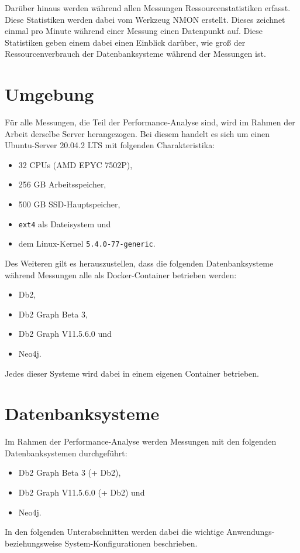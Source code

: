 Darüber hinaus werden während allen Messungen Ressourcenstatistiken erfasst. Diese Statistiken werden dabei vom Werkzeug NMON erstellt. Dieses zeichnet einmal pro Minute während einer Messung einen Datenpunkt auf. Diese Statistiken geben einem dabei einen Einblick darüber, wie groß der Ressourcenverbrauch der Datenbanksysteme während der Messungen ist.

\section{Umgebung}
\label{analyse:umgebung}
Für alle Messungen, die Teil der Performance-Analyse sind, wird im Rahmen der Arbeit derselbe Server herangezogen. Bei diesem handelt es sich um einen Ubuntu-Server 20.04.2 LTS mit folgenden Charakteristika:
\begin{itemize}
    \item 32 CPUs (AMD EPYC 7502P), 
    \item 256 GB Arbeitsspeicher,
    \item 500 GB SSD-Hauptspeicher,
    \item \texttt{ext4} als Dateisystem und 
    \item dem Linux-Kernel \texttt{5.4.0-77-generic}.
\end{itemize}
Des Weiteren gilt es herauszustellen, dass die folgenden Datenbanksysteme während Messungen alle als Docker-Container betrieben werden: 
\begin{itemize}
    \item Db2,
    \item Db2 Graph Beta 3,
    \item Db2 Graph V11.5.6.0 und 
    \item Neo4j. 
\end{itemize}
Jedes dieser Systeme wird dabei in einem eigenen Container betrieben. 

\section{Datenbanksysteme}
\label{analyse:datanbanksysteme}
Im Rahmen der Performance-Analyse werden Messungen mit den folgenden Datenbanksystemen durchgeführt: 
\begin{itemize}
    \item Db2 Graph Beta 3 (+ Db2),
    \item Db2 Graph V11.5.6.0 (+ Db2) und
    \item Neo4j.
\end{itemize}
In den folgenden Unterabschnitten werden dabei die wichtige Anwendungs- beziehungsweise System-Konfigurationen beschrieben. 

